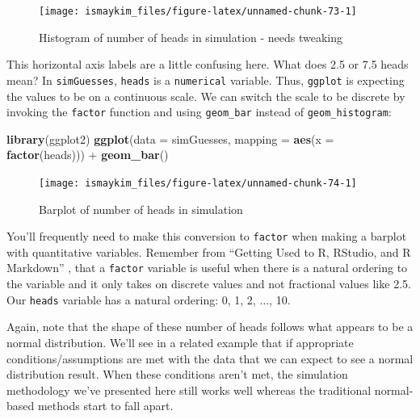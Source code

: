 \documentclass[]{tufte-book}
\newenvironment{Shaded}{\begin{snugshade}}{\end{snugshade}}
\newcommand{\KeywordTok}[1]{\textcolor[rgb]{0.13,0.29,0.53}{\textbf{{#1}}}}
\newcommand{\DataTypeTok}[1]{\textcolor[rgb]{0.13,0.29,0.53}{{#1}}}
\newcommand{\StringTok}[1]{\textcolor[rgb]{0.31,0.60,0.02}{{#1}}}
\newcommand{\NormalTok}[1]{{#1}}
\theoremstyle{definition}
\theoremstyle{definition}
\theoremstyle{remark}
\begin{document}
\begin{figure}

{\centering \texttt{[image: ismaykim\_files/figure-latex/unnamed-chunk-73-1]} 

}

\caption[Histogram of number of heads in simulation - needs tweaking]{Histogram of number of heads in simulation - needs tweaking}\label{fig:unnamed-chunk-73}
\end{figure}

This horizontal axis labels are a little confusing here. What does 2.5
or 7.5 heads mean? In \texttt{simGuesses}, \texttt{heads} is a
\texttt{numerical} variable. Thus, \texttt{ggplot} is expecting the
values to be on a continuous scale. We can switch the scale to be
discrete by invoking the \texttt{factor} function and using
\texttt{geom\_bar} instead of \texttt{geom\_histogram}:

\begin{Shaded}
\begin{Highlighting}[]
\KeywordTok{library}\NormalTok{(ggplot2)}
\KeywordTok{ggplot}\NormalTok{(}\DataTypeTok{data =} \NormalTok{simGuesses, }\DataTypeTok{mapping =} \KeywordTok{aes}\NormalTok{(}\DataTypeTok{x =} \KeywordTok{factor}\NormalTok{(heads))) +}
\StringTok{  }\KeywordTok{geom_bar}\NormalTok{()}
\end{Highlighting}
\end{Shaded}

\begin{figure}

{\centering \texttt{[image: ismaykim\_files/figure-latex/unnamed-chunk-74-1]} 

}

\caption[Barplot of number of heads in simulation]{Barplot of number of heads in simulation}\label{fig:unnamed-chunk-74}
\end{figure}

You'll frequently need to make this conversion to \texttt{factor} when
making a barplot with quantitative variables. Remember from ``Getting
Used to R, RStudio, and R Markdown'' \citep{usedtor2016}, that a
\texttt{factor} variable is useful when there is a natural ordering to
the variable and it only takes on discrete values and not fractional
values like 2.5. Our \texttt{heads} variable has a natural ordering: 0,
1, 2, \(\ldots\), 10.

Again, note that the shape of these number of heads follows what appears
to be a normal distribution. We'll see in a related example that if
appropriate conditions/assumptions are met with the data that we can
expect to see a normal distribution result. When these conditions aren't
met, the simulation methodology we've presented here still works well
whereas the traditional normal-based methods start to fall apart.
\end{document}
